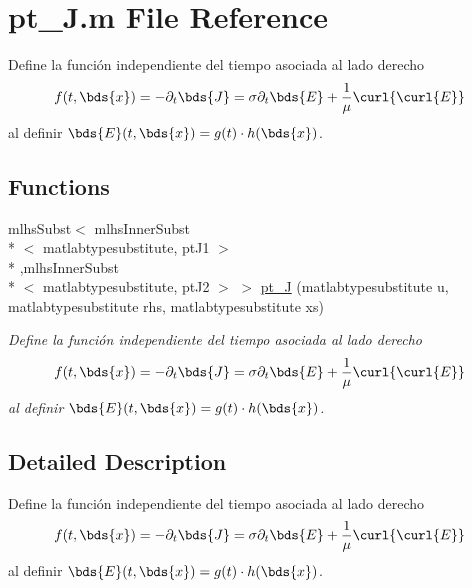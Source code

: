 \hypertarget{a00028}{\section{pt\-\_\-\-J.\-m File Reference}
\label{a00028}
}


Define la función independiente del tiempo asociada al lado derecho \[ f(t,\bds{x})=-\partial_t \bds{J}=\sigma \partial_t \bds{E} + \frac{1}{\mu} \curl{\curl{E}} \] al definir $\bds{E} (t,\bds{x})=g(t) \cdot h(\bds{x})$.  


\subsection*{Functions}
\begin{DoxyCompactItemize}
\item 
mlhs\-Subst$<$ mlhs\-Inner\-Subst\\*
$<$ matlabtypesubstitute, pt\-J1 $>$\\*
,mlhs\-Inner\-Subst\\*
$<$ matlabtypesubstitute, pt\-J2 $>$ $>$ \hyperlink{a00028_ab3dcf8377a5fc5a2e5ce23db841507b7}{pt\-\_\-\-J} (matlabtypesubstitute u, matlabtypesubstitute rhs, matlabtypesubstitute xs)
\begin{DoxyCompactList}\small\item\em Define la función independiente del tiempo asociada al lado derecho \[ f(t,\bds{x})=-\partial_t \bds{J}=\sigma \partial_t \bds{E} + \frac{1}{\mu} \curl{\curl{E}} \] al definir $\bds{E} (t,\bds{x})=g(t) \cdot h(\bds{x})$. \end{DoxyCompactList}\end{DoxyCompactItemize}


\subsection{Detailed Description}
Define la función independiente del tiempo asociada al lado derecho \[ f(t,\bds{x})=-\partial_t \bds{J}=\sigma \partial_t \bds{E} + \frac{1}{\mu} \curl{\curl{E}} \] al definir $\bds{E} (t,\bds{x})=g(t) \cdot h(\bds{x})$. 

